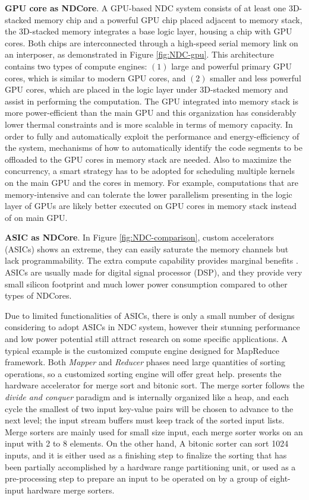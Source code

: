 \documentclass[letterpaper, 11pt, conference, margin=1in]{ieeeconf}   %
\begin{document}
\textbf{GPU core as NDCore}. A GPU-based NDC system consists of at least one 3D-stacked memory chip and a powerful GPU chip placed adjacent to memory stack, the 3D-stacked memory integrates a base logic layer, housing a chip with GPU cores. Both chips are interconnected through a high-speed serial memory link on an interposer, as demonstrated in Figure \ref{fig:NDC-gpu}. This architecture contains two types of compute engines: $\left(1\right)$ large and powerful primary GPU cores, which is similar to modern GPU cores, and $\left(2\right)$ smaller and less powerful GPU cores, which are placed in the logic layer under 3D-stacked memory and assist in performing the computation. The GPU integrated into memory stack is more power-efficient than the main GPU and this organization has considerably lower thermal constraints and is more scalable in terms of memory capacity. In order to fully and automatically exploit the performance and energy-efficiency of the system, mechanisms of how to automatically identify the code segments to be offloaded to the GPU cores in memory stack are needed. Also to maximize the concurrency, a smart strategy has to be adopted for scheduling multiple kernels on the main GPU and the cores in memory. For example, computations that are memory-intensive and can tolerate the lower parallelism presenting in the logic layer of GPUs are likely better executed on GPU cores in memory stack instead of on main GPU.

\textbf{ASIC as NDCore}. In Figure \ref{fig:NDC-comparison}, custom accelerators (ASICs) shows an extreme, they can easily saturate the memory channels but lack programmability. The extra compute capability provides marginal benefits \cite{7446059, Loh2013APT}. ASICs are usually made for digital signal processor (DSP), and they provide very small silicon footprint and much lower power consumption compared to other types of NDCores.

Due to limited functionalities of ASICs, there is only a small number of designs considering to adopt ASICs in NDC system, however their stunning performance and low power potential still attract research on some specific applications. A typical example is the customized compute engine designed for MapReduce framework. Both \textit{Mapper} and \textit{Reducer} phases need large quantities of sorting operations, so a customized sorting engine will offer great help. \cite{Pugsley2015FixedfunctionHS} presents the hardware accelerator for merge sort and bitonic sort. The merge sorter follows the \textit{divide and conquer} paradigm and is internally organized like a heap, and each cycle the smallest of two input key-value pairs will be chosen to advance to the next level; the input stream buffers must keep track of the sorted input lists. Merge sorters are mainly used for small size input, each merge sorter works on an input with 2 to 8 elements. On the other hand, A bitonic sorter can sort 1024 inputs, and it is either used as a finishing step to finalize the sorting that has been partially accomplished by a hardware range partitioning unit, or used as a pre-processing step to prepare an input to be operated on by a group of eight-input hardware merge sorters.
\end{document}
